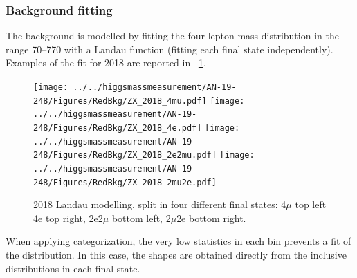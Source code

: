\subsubsection{Background fitting}
The background is modelled by fitting the four-lepton mass distribution in the range 70--770\GeV
with a Landau function (fitting each final state independently).
Examples of the fit for 2018 are reported in \figurename~\ref{ZX_models_2018}.
\begin{figure}[!htbp]
	\begin{center}
		\texttt{[image: ../../higgsmassmeasurement/AN-19-248/Figures/RedBkg/ZX\_2018\_4mu.pdf]}
		\texttt{[image: ../../higgsmassmeasurement/AN-19-248/Figures/RedBkg/ZX\_2018\_4e.pdf]}
		\texttt{[image: ../../higgsmassmeasurement/AN-19-248/Figures/RedBkg/ZX\_2018\_2e2mu.pdf]}
		\texttt{[image: ../../higgsmassmeasurement/AN-19-248/Figures/RedBkg/ZX\_2018\_2mu2e.pdf]}
		\caption{2018 \ZplusX Landau modelling, split in four different final states:
		4$\mu$ top left 4e top right, 2e2$\mu$ bottom left, 2$\mu$2e bottom right.}
		\label{ZX_models_2018}
	\end{center}
\end{figure}
When applying categorization, the very low statistics in each bin prevents a fit of the distribution.
In this case, the shapes are obtained directly from the inclusive distributions in each final state.




